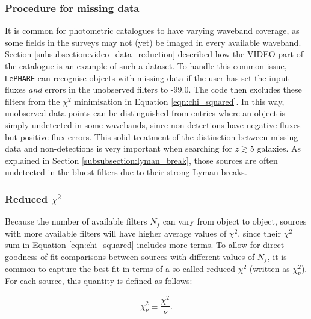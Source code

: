\subsubsection{Procedure for missing data}
It is common for photometric catalogues to have varying waveband coverage, as some fields in the surveys may not (yet) be imaged in every available waveband. Section \ref{subsubsection:video_data_reduction} described how the VIDEO part of the \DESVIDEO catalogue is an example of such a dataset. To handle this common issue, \texttt{LePHARE} can recognise objects with missing data if the user has set the input fluxes \textit{and} errors in the unobserved filters to -99.0. The code then excludes these filters from the $\chi^2$ minimisation in Equation \ref{eqn:chi_squared}. In this way, unobserved data points can be distinguished from entries where an object is simply undetected in some wavebands, since non-detections have negative fluxes but positive flux errors. This solid treatment of the distinction between missing data and non-detections is very important when searching for $z\gtrsim5$ galaxies. As explained in Section \ref{subsubsection:lyman_break}, those sources are often undetected in the bluest filters due to their strong Lyman breaks.\par



\subsubsection{Reduced \texorpdfstring{$\chi^2$}{TEXT}}
Because the number of available filters $N_{f}$ can vary from object to object, sources with more available filters will have higher average values of $\chi^2$, since their $\chi^2$ sum in Equation \ref{eqn:chi_squared} includes more terms. To allow for direct goodness-of-fit comparisons between sources with different values of $N_{f}$, it is common to capture the best fit in terms of a so-called reduced $\chi^2$ (written as $\chi^2_{\nu}$). For each source, this quantity is defined as follows: 

\begin{equation}
    \chi^2_{\nu} \equiv \frac{\chi^2}{\nu}. 
\end{equation}

